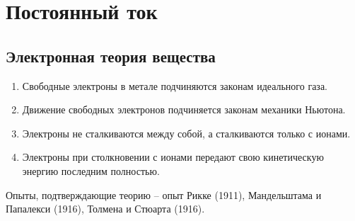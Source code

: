 \section{Постоянный ток}



\subsection{Электронная теория вещества}
\begin{enumerate}
	\item Свободные электроны в метале подчиняются законам идеального газа.
	\item Движение свободных электронов подчиняется законам механики Ньютона.
	\item Электроны не сталкиваются между собой, а сталкиваются только с ионами.
	\item Электроны при столкновении с ионами передают свою кинетическую энергию последним полностью.
\end{enumerate}
Опыты, подтверждающие теорию -- опыт Рикке (1911), Мандельштама и Папалекси (1916), Толмена и Стюарта  (1916).



